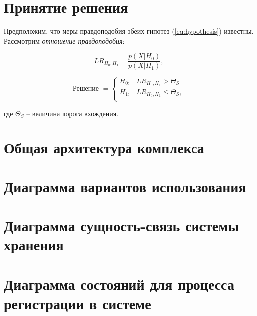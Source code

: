 \documentclass[12pt]{article}
\newcommand{\important}[1]{\emph{#1}}
\begin{document}
\section{Принятие решения}

Предположим, что меры правдоподобия обеих гипотез (\ref{eq:hypothesis}) известны. Рассмотрим \important{отношение правдоподобия}:

\begin{equation}
\label{eq:lr}
LR_{H_0, H_1} = \frac{p(X|H_0)}{p(X|H_1)},
\end{equation}

\begin{equation}
\label{eq:decision}
\textrm{Решение } = \left\{ 
    \begin{array}{ll}
        H_0, & LR_{H_0, H_1} > \Theta_{S} \\
        H_1, & LR_{H_0, H_1} \leq \Theta_{S}, \\
    \end{array}
\right.
\end{equation}

\noindent где $\Theta_{S}$ -- величина порога вхождения.

\section{Общая архитектура комплекса}

\begin{figure}[h!]
\end{figure}


\section{Диаграмма вариантов использования}

\begin{figure}[h!]
\end{figure}

\section{Диаграмма сущность-связь системы хранения}

\begin{figure}[h!]
\end{figure}

\section{Диаграмма состояний для процесса регистрации в системе}
\end{document}
